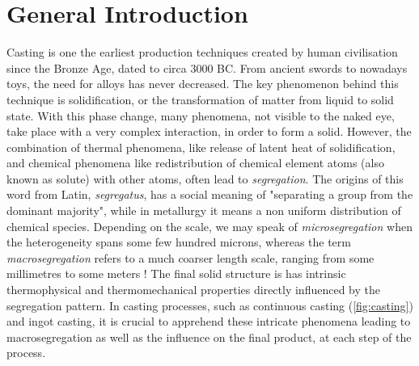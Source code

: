 \chapter{General Introduction}
Casting is one the earliest production techniques created by human civilisation since the Bronze Age, dated to circa 3000 BC. 
From ancient swords to nowadays toys, the need for alloys has never decreased.
The key phenomenon behind this technique is solidification, or the transformation of matter from liquid to solid state. With this phase change, 
many phenomena, not visible to the naked eye, take place with a very complex interaction, in order to form a solid. 
However, the combination of thermal phenomena, like release of latent heat of solidification, and chemical phenomena like redistribution of chemical
element atoms (also known as solute) with other atoms, often lead to \emph{segregation}. The origins of this
word from Latin, \emph{segregatus}, has a social meaning of "separating a group from the dominant majority", while 
in metallurgy it means a non uniform distribution of chemical species. Depending on the scale, we may speak of \emph{microsegregation}
when the heterogeneity spans some few hundred microns, whereas the term \emph{macrosegregation} refers to a much coarser length scale, ranging
from some millimetres to some meters ! The final solid structure is has intrinsic thermophysical and thermomechanical properties directly influenced by the segregation pattern. 
In casting processes, such as continuous casting (\cref{fig:casting}) and ingot casting, it is crucial to apprehend 
these intricate phenomena leading to macrosegregation as well as the influence on the final product, at each step of the process. 

